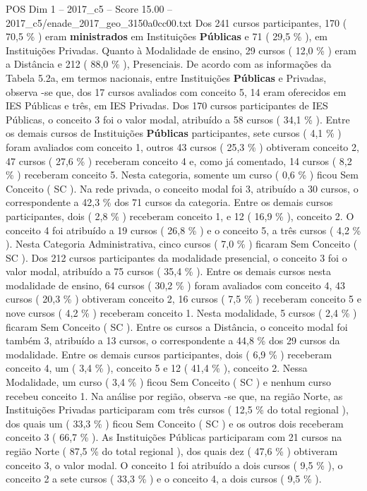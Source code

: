 \begin{textsample}{POS Dim 1 – 2017\_c5 – Score 15.00 – 2017\_c5/enade\_2017\_geo\_3150a0cc00.txt}
Dos 241 cursos participantes, 170 ( 70,5 \% ) eram \textbf{ministrados} em Instituições \textbf{Públicas} e 71 ( 29,5 \% ), em Instituições Privadas.
Quanto à Modalidade de ensino, 29 cursos ( 12,0 \% ) eram a Distância e 212 ( 88,0 \% ), Presenciais.
De acordo com as informações da Tabela 5.2a, em termos nacionais, entre Instituições \textbf{Públicas} e Privadas, observa -se que, dos 17 cursos avaliados com conceito 5, 14 eram oferecidos em IES Públicas e três, em IES Privadas.
Dos 170 cursos participantes de IES Públicas, o conceito 3 foi o valor modal, atribuído a 58 cursos ( 34,1 \% ).
Entre os demais cursos de Instituições \textbf{Públicas} participantes, sete cursos ( 4,1 \% ) foram avaliados com conceito 1, outros 43 cursos ( 25,3 \% ) obtiveram conceito 2, 47 cursos ( 27,6 \% ) receberam conceito 4 e, como já comentado, 14 cursos ( 8,2 \% ) receberam conceito 5.
Nesta categoria, somente um curso ( 0,6 \% ) ficou Sem Conceito ( SC ).
Na rede privada, o conceito modal foi 3, atribuído a 30 cursos, o correspondente a 42,3 \% dos 71 cursos da categoria.
Entre os demais cursos participantes, dois ( 2,8 \% ) receberam conceito 1, e 12 ( 16,9 \% ), conceito 2.
O conceito 4 foi atribuído a 19 cursos ( 26,8 \% ) e o conceito 5, a três cursos ( 4,2 \% ).
Nesta Categoria Administrativa, cinco cursos ( 7,0 \% ) ficaram Sem Conceito ( SC ).
Dos 212 cursos participantes da modalidade presencial, o conceito 3 foi o valor modal, atribuído a 75 cursos ( 35,4 \% ).
Entre os demais cursos nesta modalidade de ensino, 64 cursos ( 30,2 \% ) foram avaliados com conceito 4, 43 cursos ( 20,3 \% ) obtiveram conceito 2, 16 cursos ( 7,5 \% ) receberam conceito 5 e nove cursos ( 4,2 \% ) receberam conceito 1.
Nesta modalidade, 5 cursos ( 2,4 \% ) ficaram Sem Conceito ( SC ).
Entre os cursos a Distância, o conceito modal foi também 3, atribuído a 13 cursos, o correspondente a 44,8 \% dos 29 cursos da modalidade.
Entre os demais cursos participantes, dois ( 6,9 \% ) receberam conceito 4, um ( 3,4 \% ), conceito 5 e 12 ( 41,4 \% ), conceito 2.
Nessa Modalidade, um curso ( 3,4 \% ) ficou Sem Conceito ( SC ) e nenhum curso recebeu conceito 1.
Na análise por região, observa -se que, na região Norte, as Instituições Privadas participaram com três cursos ( 12,5 \% do total regional ), dos quais um ( 33,3 \% ) ficou Sem Conceito ( SC ) e os outros dois receberam conceito 3 ( 66,7 \% ).
As Instituições Públicas participaram com 21 cursos na região Norte ( 87,5 \% do total regional ), dos quais dez ( 47,6 \% ) obtiveram conceito 3, o valor modal.
O conceito 1 foi atribuído a dois cursos ( 9,5 \% ), o conceito 2 a sete cursos ( 33,3 \% ) e o conceito 4, a dois cursos ( 9,5 \% ).

\end{textsample}

